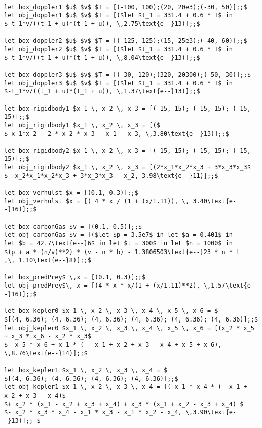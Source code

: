 {\scriptsize
\begin{lstlisting}

let box_doppler1 $u$ $v$ $T = [(-100, 100);(20, 20e3);(-30, 50)];;$ 
let obj_doppler1 $u$ $v$ $T = [($let $t_1 = 331.4 + 0.6 * T$ in 
$-t_1*v/((t_1 + u)*(t_1 + u)), \,2.75\text{e--}13)];;$

let box_doppler2 $u$ $v$ $T = [(-125, 125);(15, 25e3);(-40, 60)];;$ 
let obj_doppler2 $u$ $v$ $T = [($let $t_1 = 331.4 + 0.6 * T$ in 
$-t_1*v/((t_1 + u)*(t_1 + u)), \,8.04\text{e--}13)];;$

let box_doppler3 $u$ $v$ $T = [(-30, 120);(320, 20300);(-50, 30)];;$ 
let obj_doppler3 $u$ $v$ $T = [($let $t_1 = 331.4 + 0.6 * T$ in 
$-t_1*v/((t_1 + u)*(t_1 + u)), \,1.37\text{e--}13)];;$

let box_rigidbody1 $x_1 \, x_2 \, x_3 = [(-15, 15); (-15, 15); (-15, 15)];;$
let obj_rigidbody1 $x_1 \, x_2 \, x_3 = [($
$-x_1*x_2 - 2 * x_2 * x_3 - x_1 - x_3, \,3.80\text{e--}13)];;$

let box_rigidbody2 $x_1 \, x_2 \, x_3 = [(-15, 15); (-15, 15); (-15, 15)];;$
let obj_rigidbody2 $x_1 \, x_2 \, x_3 = [(2*x_1*x_2*x_3 + 3*x_3*x_3$ 
$- x_2*x_1*x_2*x_3 + 3*x_3*x_3 - x_2, 3.98\text{e--}11)];;$

let box_verhulst $x = [(0.1, 0.3)];;$
let obj_verhulst $x = [( 4 * x / (1 + (x/1.11)), \, 3.40\text{e--}16)];;$

let box_carbonGas $v = [(0.1, 0.5)];;$
let obj_carbonGas $v = [($let $p = 3.5e7$ in let $a = 0.401$ in 
let $b = 42.7\text{e--}6$ in let $t = 300$ in let $n = 1000$ in
$(p + a * (n/v)**2) * (v - n * b) - 1.3806503\text{e--}23 * n * t
,\, 1.10\text{e--}8)];;$

let box_predPrey$ \,x = [(0.1, 0.3)];;$
let obj_predPrey$\, x = [(4 * x * x/(1 + (x/1.11)**2), \,1.57\text{e--}16)];;$

let box_kepler0 $x_1 \, x_2 \, x_3 \, x_4 \, x_5 \, x_6 = $
$[(4, 6.36); (4, 6.36); (4, 6.36); (4, 6.36); (4, 6.36); (4, 6.36)];;$
let obj_kepler0 $x_1 \, x_2 \, x_3 \, x_4 \, x_5 \, x_6 = [(x_2 * x_5 + x_3 * x_6 - x_2 * x_3$
$- x_5 * x_6 + x_1 * ( - x_1 + x_2 + x_3 - x_4 + x_5 + x_6), \,8.76\text{e--}14)];;$

let box_kepler1 $x_1 \, x_2 \, x_3 \, x_4 = $
$[(4, 6.36); (4, 6.36); (4, 6.36); (4, 6.36)];;$
let obj_kepler1 $x_1 \, x_2 \, x_3 \, x_4 = [( x_1 * x_4 * (- x_1 + x_2 + x_3 - x_4)$
$+ x_2 * (x_1 - x_2 + x_3 + x_4) + x_3 * (x_1 + x_2 - x_3 + x_4) $
$- x_2 * x_3 * x_4 - x_1 * x_3 - x_1 * x_2 - x_4, \,3.90\text{e--}13)];; $


\end{lstlisting}}
